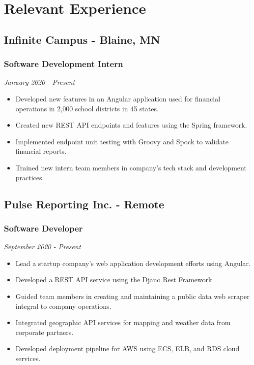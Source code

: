 \documentclass{article}
\begin{document}
\section{Relevant Experience}

\subsection{Infinite Campus - Blaine, MN}
\subsubsection{Software Development Intern}
\textit{January 2020 - Present}
\begin{itemize}[leftmargin=*]
	\item Developed new features in an Angular application used for financial operations in 2,000 school districts in 45 states.
	\item Created new REST API endpoints and features using the Spring framework.
	\item Implemented endpoint unit testing with Groovy and Spock to validate financial reports.
	\item Trained new intern team members in company's tech stack and development practices.
\end{itemize}


\subsection{Pulse Reporting Inc. - Remote}
\subsubsection{Software Developer}
\textit{September 2020 - Present}
\begin{itemize}[leftmargin=*]
	\item Lead a startup company's web application development efforts using Angular.	
	\item Developed a REST API service using the Djano Rest Framework
	\item Guided team members in creating and maintaining a public data web scraper integral to company operations.
	\item Integrated geographic API services for mapping and weather data from corporate partners.
	\item Developed deployment pipeline for AWS using ECS, ELB, and RDS cloud services.
\end{itemize}
\end{document}
